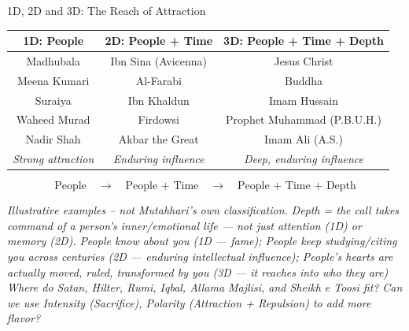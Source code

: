 \begin{frame}{1D, 2D and 3D: The Reach of Attraction}

\centering
\scriptsize
\renewcommand{\arraystretch}{1.35}
\begin{tabular}{|c|c|c|}
\hline
\textbf{1D: People} &
\textbf{2D: People + Time} &
\textbf{3D: People + Time + Depth} \\
\hline
Madhubala &
Ibn Sina (Avicenna) &
Jesus Christ \\
Meena Kumari &
Al-Farabi &
Buddha \\
Suraiya &
Ibn Khaldun &
Imam Hussain \\
Waheed Murad &
Firdowsi &
Prophet Muhammad (P.B.U.H.) \\
Nadir Shah &
Akbar the Great &
Imam Ali (A.S.) \\
\hline
\textit{Strong attraction} &
\textit{Enduring influence} &
\textit{Deep, enduring influence} \\
\hline
\end{tabular}

\vspace{0.2cm}

\large
\[
\boxed{
\text{People}
\quad\longrightarrow\quad
\text{People + Time}
\quad\longrightarrow\quad
\text{People + Time + Depth}
}
\]

\vspace{0.15cm}

\footnotesize
\textit{Illustrative examples -- not Mutahhari's own classification.}
\newline
\textit{
   Depth = the call takes command of a person's inner/emotional life --- not just attention (1D) or memory (2D).
}
\newline
\textit{
   People know about you (1D — fame); 
   People keep studying/citing you across centuries (2D — enduring intellectual influence); 
   People's hearts are actually moved, ruled, transformed by you (3D — it reaches into who they are)
}
\newline
\textit{Where do Satan, Hilter, Rumi, Iqbal, Allama Majlisi, and Sheikh e Toosi fit?}
\newline
\textit{Can we use Intensity (Sacrifice), Polarity (Attraction + Repulsion) to add more flavor?}
\end{frame}



